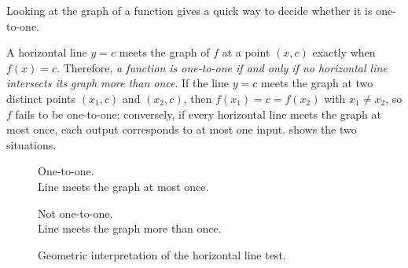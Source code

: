 Looking at the graph of a function gives a quick way to decide whether it is one-to-one.

\begin{remark}
A horizontal line \(y = c\) meets the graph of \(f\) at a point \((x, c)\) exactly when \(f(x) = c\). Therefore, \emph{a function is one-to-one if and only if no horizontal line intersects its graph more than once}. If the line \(y = c\) meets the graph at two distinct points \((x_{1}, c)\) and \((x_{2}, c)\), then \(f(x_{1}) = c = f(x_{2})\) with \(x_{1} \neq x_{2}\), so \(f\) fails to be one-to-one; conversely, if every horizontal line meets the graph at most once, each output corresponds to at most one input.  shows the two situations.
\end{remark}

\begin{figure}[H]
\centering
\begin{minipage}{0.46\textwidth}
\centering
{}

\vspace{0.4em}
One-to-one.\\
Line meets the graph at most once.
\end{minipage}
\hfill
\begin{minipage}{0.46\textwidth}
\centering
{}

\vspace{0.4em}
Not one-to-one.\\
Line meets the graph more than once.
\end{minipage}
\caption{Geometric interpretation of the horizontal line test.}
\label{fig:horizontal-line-test}
\end{figure}

